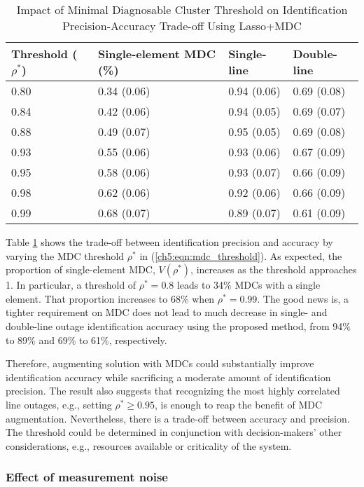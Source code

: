 \begin{table}[!htpb]
\caption{Impact of Minimal Diagnosable Cluster Threshold on Identification Precision-Accuracy Trade-off Using Lasso+MDC}
\label{ch5:tab:impact_mdc_threshold}
\centering
\begin{tabular}{llll}
\hline
\hline
Threshold ($\rho^*$)  & Single-element MDC (\%) & Single-line & Double-line \\
\hline
0.80 & 0.34 (0.06) & 0.94 (0.06) & 0.69 (0.08) \\
0.84 & 0.42 (0.06) & 0.94 (0.05) & 0.69 (0.07) \\
0.88 & 0.49 (0.07) & 0.95 (0.05) & 0.69 (0.08) \\
0.93 & 0.55 (0.06) & 0.93 (0.06) & 0.67 (0.09) \\
0.95 & 0.58 (0.06) & 0.93 (0.07) & 0.66 (0.09) \\
0.98 & 0.62 (0.06) & 0.92 (0.06) & 0.66 (0.09) \\
0.99 & 0.68 (0.07) & 0.89 (0.07) & 0.61 (0.09) \\
\hline 
\end{tabular}
\end{table}
Table \ref{ch5:tab:impact_mdc_threshold} shows the trade-off between identification precision and accuracy by varying the MDC threshold $\rho^*$ in (\ref{ch5:eqn:mdc_threshold}). As expected, the proportion of single-element MDC, $V(\rho^*)$, increases as the threshold approaches 1. In particular, a threshold of $\rho^* = 0.8$ leads to 34\% MDCs with a single element. That proportion increases to 68\% when $\rho^* = 0.99$. The good news is, a tighter requirement on MDC does not lead to much decrease in single- and double-line outage identification accuracy using the proposed method, from 94\% to 89\% and 69\% to 61\%, respectively. 

Therefore, augmenting solution with MDCs could substantially improve identification accuracy while sacrificing a moderate amount of identification precision. The result also suggests that recognizing the most highly correlated line outages, e.g., setting $\rho^* \ge 0.95$, is enough to reap the benefit of MDC augmentation. Nevertheless, there is a trade-off between accuracy and precision. The threshold could be determined in conjunction with decision-makers' other considerations, e.g., resources available or criticality of the system. 

\subsubsection{Effect of measurement noise} 

